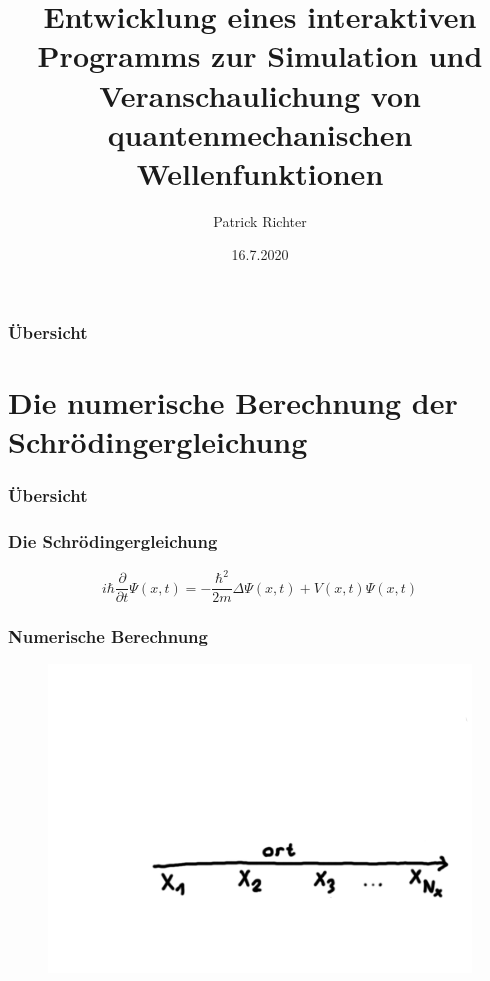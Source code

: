 \documentclass{beamer}
\begin{document}
 	\title[Crisis]
 	{Entwicklung eines interaktiven Programms zur Simulation und Veranschaulichung von quantenmechanischen Wellenfunktionen}
 	\author %
 	{Patrick Richter}
 	\date %
 	{16.7.2020}
 	
 	\begin{frame}[plain]
 		\titlepage
 	\end{frame}
 \begin{frame}
 	\frametitle{Übersicht}
 	\tableofcontents
 \end{frame}
\section{Die numerische Berechnung der Schrödingergleichung}
 	\begin{frame}
 		\frametitle{Übersicht}
 		\tableofcontents[currentsection]
 	\end{frame}
 	\begin{frame}
 		\frametitle{Die Schrödingergleichung}
 		\begin{equation*}
 			i\hbar\frac{\partial}{\partial t}\Psi(x,t)=- \frac{\hbar^2}{2m}\Delta \Psi(x, t) + V(x, t) \Psi(x, t)
 			\label{Schroedingergleichnung}
 		\end{equation*}
 	\end{frame}
\begin{frame}
\frametitle{Numerische Berechnung}
\begin{figure}
	\includegraphics[width=0.8\linewidth,height=\textheight,keepaspectratio]{./numerisch1.png}
\end{figure}
\end{frame}
\end{document}
